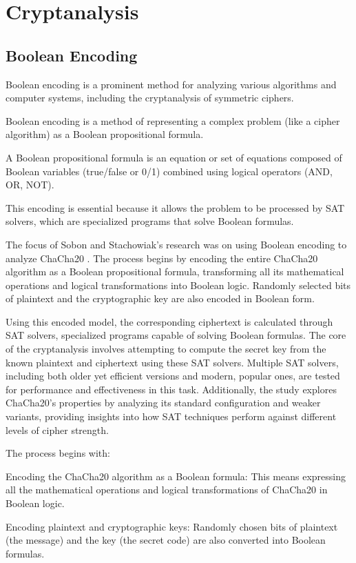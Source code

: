 \documentclass[a4paper,12pt]{report}
\begin{document}
\section{Cryptanalysis}
\subsection{Boolean Encoding}
Boolean encoding is a prominent method for analyzing various algorithms and computer systems, including the cryptanalysis of symmetric ciphers.

Boolean encoding is a method of representing a complex problem (like a cipher algorithm) as a Boolean propositional formula.

A Boolean propositional formula is an equation or set of equations composed of Boolean variables (true/false or 0/1) combined using logical operators (AND, OR, NOT).

This encoding is essential because it allows the problem to be processed by SAT solvers, which are specialized programs that solve Boolean formulas.

The focus of Sobon and Stachowiak's research was on using Boolean encoding to analyze ChaCha20 \cite{sobon2024chacha20}.
The process begins by encoding the entire ChaCha20 algorithm as a Boolean propositional formula, transforming all its mathematical operations and logical transformations into Boolean logic.
Randomly selected bits of plaintext and the cryptographic key are also encoded in Boolean form.

Using this encoded model, the corresponding ciphertext is calculated through SAT solvers, specialized programs capable of solving Boolean formulas.
The core of the cryptanalysis involves attempting to compute the secret key from the known plaintext and ciphertext using these SAT solvers.
Multiple SAT solvers, including both older yet efficient versions and modern, popular ones, are tested for performance and effectiveness in this task.
Additionally, the study explores ChaCha20’s properties by analyzing its standard configuration and weaker variants, providing insights into how SAT techniques perform against different levels of cipher strength.


The process begins with:

Encoding the ChaCha20 algorithm as a Boolean formula: This means expressing all the mathematical operations and logical transformations of ChaCha20 in Boolean logic.

Encoding plaintext and cryptographic keys: Randomly chosen bits of plaintext (the message) and the key (the secret code) are also converted into Boolean formulas.
\end{document}

